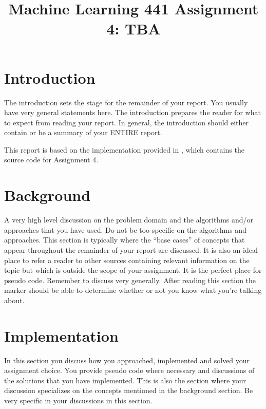 \documentclass[conference]{IEEEtran}
\begin{document}
	
	\title{Machine Learning 441 Assignment 4: TBA}
	\author{
	}
	\maketitle
	
	\begin{abstract}
	\end{abstract}
	
	\section{Introduction}
	The introduction sets the stage for the remainder of your report. You usually have very general statements here.
	The introduction prepares the reader for what to expect from reading your report. In general, the introduction
	should either contain or be a summary of your ENTIRE report.
	
	This report is based on the implementation provided in \cite{github}, which contains the source code for Assignment 4.
	
	\section{Background}\label{B}
	A very high level discussion on the problem domain and the algorithms and/or approaches that you have used.
	Do not be too specific on the algorithms and approaches. This section is typically where the “base cases” of
	concepts that appear throughout the remainder of your report are discussed. It is also an ideal place to refer
	a reader to other sources containing relevant information on the topic but which is outside the scope of your
	assignment. It is the perfect place for pseudo code. Remember to discuss very generally. After reading this
	section the marker should be able to determine whether or not you know what you’re talking about.
	
	\section{Implementation}\label{I}
	In this section you discuss how you approached, implemented and solved your assignment choice. You provide
	pseudo code where necessary and discussions of the solutions that you have implemented. This is also the
	section where your discussion specializes on the concepts mentioned in the background section. Be very specific
	in your discussions in this section.
	
\end{document}
